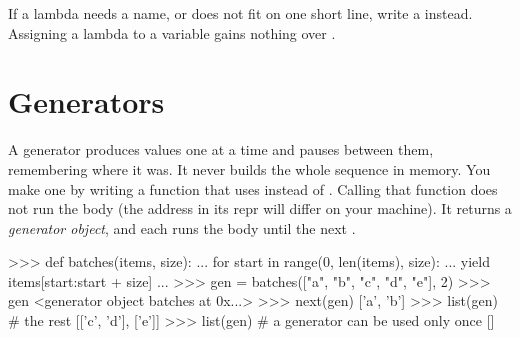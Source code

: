 \begin{gamerule}
If a lambda needs a name, or does not fit on one short line, write a  instead.
Assigning a lambda to a variable gains nothing over .
\end{gamerule}

\section{Generators}

A generator produces values one at a time and pauses between them, remembering where it was.
It never builds the whole sequence in memory. You make one by writing a function that uses
 instead of . Calling that function does not run the body (the address in its repr will differ on your machine). It returns a
\emph{generator object}, and each  runs the body until the next .

\begin{center}
\end{center}

\begin{pycode}
>>> def batches(items, size):
...     for start in range(0, len(items), size):
...         yield items[start:start + size]
...
>>> gen = batches(["a", "b", "c", "d", "e"], 2)
>>> gen
<generator object batches at 0x...>
>>> next(gen)
['a', 'b']
>>> list(gen)           # the rest
[['c', 'd'], ['e']]
>>> list(gen)           # a generator can be used only once
[]
\end{pycode}

